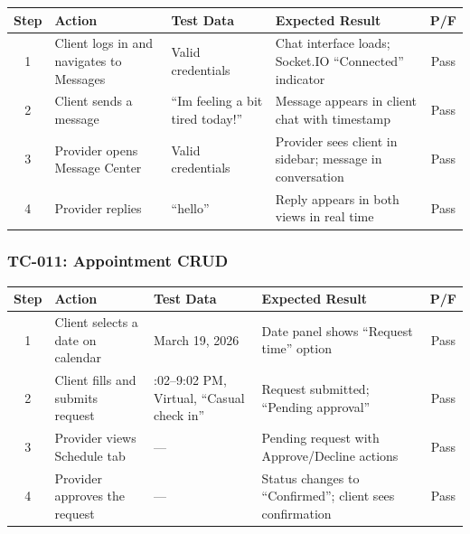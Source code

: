 \documentclass[12pt,letterpaper]{article}
\begin{document}
\begin{table}[H]
\centering
\small
\begin{tabularx}{\textwidth}{|c|>{\raggedright\arraybackslash}X|>{\raggedright\arraybackslash}p{3cm}|>{\raggedright\arraybackslash}X|c|}
\hline
\rowcolor{TableHeader}\textcolor{TableHeaderText}{\textbf{Step}} & \textcolor{TableHeaderText}{\textbf{Action}} & \textcolor{TableHeaderText}{\textbf{Test Data}} & \textcolor{TableHeaderText}{\textbf{Expected Result}} & \textcolor{TableHeaderText}{\textbf{P/F}} \\
\hline
1 & Client logs in and navigates to Messages & Valid credentials & Chat interface loads; Socket.IO ``Connected'' indicator & Pass \\
\hline
\rowcolor{TableRowAlt}
2 & Client sends a message & ``Im feeling a bit tired today!'' & Message appears in client chat with timestamp & Pass \\
\hline
3 & Provider opens Message Center & Valid credentials & Provider sees client in sidebar; message in conversation & Pass \\
\hline
\rowcolor{TableRowAlt}
4 & Provider replies & ``hello'' & Reply appears in both views in real time & Pass \\
\hline
\end{tabularx}
\end{table}

\subsubsection*{TC-011: Appointment CRUD}

\begin{table}[H]
\centering
\small
\begin{tabularx}{\textwidth}{|c|>{\raggedright\arraybackslash}X|>{\raggedright\arraybackslash}p{3cm}|>{\raggedright\arraybackslash}X|c|}
\hline
\rowcolor{TableHeader}\textcolor{TableHeaderText}{\textbf{Step}} & \textcolor{TableHeaderText}{\textbf{Action}} & \textcolor{TableHeaderText}{\textbf{Test Data}} & \textcolor{TableHeaderText}{\textbf{Expected Result}} & \textcolor{TableHeaderText}{\textbf{P/F}} \\
\hline
1 & Client selects a date on calendar & March 19, 2026 & Date panel shows ``Request time'' option & Pass \\
\hline
\rowcolor{TableRowAlt}
2 & Client fills and submits request & 7:02--9:02 PM, Virtual, ``Casual check in'' & Request submitted; ``Pending approval'' & Pass \\
\hline
3 & Provider views Schedule tab & --- & Pending request with Approve/Decline actions & Pass \\
\hline
\rowcolor{TableRowAlt}
4 & Provider approves the request & --- & Status changes to ``Confirmed''; client sees confirmation & Pass \\
\hline
\end{tabularx}
\end{table}
\end{document}
